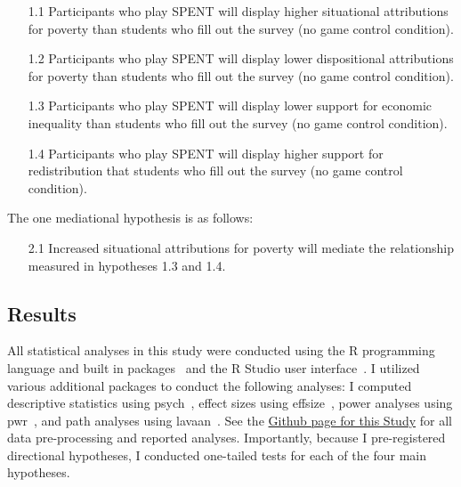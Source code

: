 \documentclass{sfuthesis}
\begin{document}
\begin{itemize}
  \item [1.1]	Participants who play SPENT will display higher situational attributions for poverty than students who fill out the survey (no game control condition).\newline
  \item [1.2]	Participants who play SPENT will display lower dispositional attributions for poverty than students who fill out the survey (no game control condition).\newline
  \item [1.3]	Participants who play SPENT will display lower support for economic inequality than students who fill out the survey (no game control condition).\newline
  \item [1.4]	Participants who play SPENT will display higher support for redistribution that students who fill out the survey (no game control condition).
\end{itemize}

\begin{flushleft}
The one mediational hypothesis is as follows:
\end{flushleft}

\begin{itemize}
  \item [2.1]	Increased situational attributions for poverty will mediate the relationship measured in hypotheses 1.3 and 1.4.
\end{itemize}

\subsection{Results}

All statistical analyses in this study were conducted using the R programming language and built in packages~\cite{rcore} and the R Studio user interface~\cite{rstudio16}. I utilized various additional packages to conduct the following analyses: I computed descriptive statistics using psych~\cite{revelle17}, effect sizes using effsize~\cite{torchiano17}, power analyses using pwr~\cite{champely18}, and path analyses using lavaan~\cite{rosseel12}. See the \href{https://github.com/dwiwad/Dissertation/tree/master/Study 2a and 2b}{Github page for this Study} for all data pre-processing and reported analyses. Importantly, because I pre-registered directional hypotheses, I conducted one-tailed tests for each of the four main hypotheses.
\end{document}
